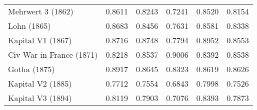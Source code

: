 \begin{table}
\begin{tabular}{lrrrrr}
Mehrwert 3 (1862)        &           0.8611 &                 0.8243 &               0.7241 &           0.8520 & 0.8154 \\
Lohn (1865)              &           0.8683 &                 0.8456 &               0.7631 &           0.8581 & 0.8338 \\
Kapital V1 (1867)        &           0.8716 &                 0.8748 &               0.7794 &           0.8952 & 0.8553 \\
Civ War in France (1871) &           0.8218 &                 0.8537 &               0.9006 &           0.8392 & 0.8538 \\
Gotha (1875)             &           0.8917 &                 0.8645 &               0.8323 &           0.8619 & 0.8626 \\
Kapital V2 (1885)        &           0.7712 &                 0.7554 &               0.6843 &           0.7998 & 0.7526 \\
Kapital V3 (1894)        &           0.8119 &                 0.7903 &               0.7076 &           0.8393 & 0.7873 \\
\bottomrule
\end{tabular}
\end{table}
